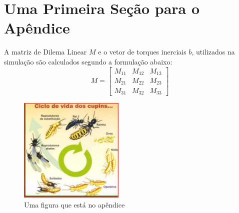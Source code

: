 \section{Uma Primeira Seção para o Apêndice}

A matriz de Dilema Linear $M$ e o vetor de torques inerciais $b$,
utilizados na simulação são calculados segundo a formulação 
abaixo:
\begin{equation}
M=\left[ \begin{array}{ccc}
M_{11} & M_{12} & M_{13} \\
M_{21} & M_{22} & M_{23} \\
M_{31} & M_{32} & M_{33}
\end{array} \right]
\end{equation}

\begin{figure}[h]
\centering
\includegraphics[height=5cm, width=5cm]{ApeA/pragas_ciclo_cupim}
\caption{Uma figura que está no apêndice}\label{FD}
\end{figure}
